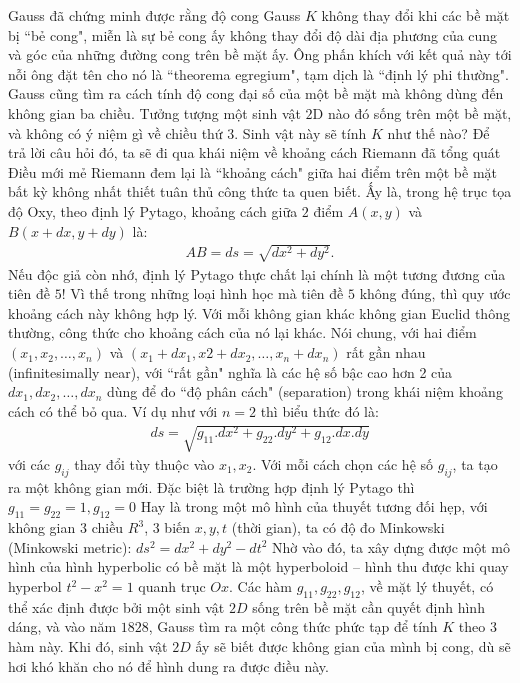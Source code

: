 \begin{multicols}{2}
	\vskip 0.1cm
	Gauss đã chứng minh được rằng độ cong Gauss $K$ không thay đổi khi các bề mặt bị ``bẻ cong", miễn là sự bẻ cong ấy không thay đổi độ dài địa phương của cung và góc của những đường cong trên bề mặt ấy. 
	\vskip 0.1cm
	Ông phấn khích với kết quả này tới nỗi ông đặt tên cho nó là ``theorema egregium", tạm dịch là ``định lý phi thường". Gauss cũng tìm ra cách tính độ cong đại số của một bề mặt mà không dùng đến không gian ba chiều. Tưởng tượng một sinh vật $2$D nào đó sống trên một bề mặt, và không có ý niệm gì về chiều thứ $3$. Sinh vật này sẽ tính $K$ như thế nào? Để trả lời câu hỏi đó, ta sẽ đi qua khái niệm về khoảng cách Riemann đã tổng quát
	\vskip 0.1cm
	Điều mới mẻ Riemann đem lại là ``khoảng cách" giữa hai điểm trên một bề mặt bất kỳ không nhất thiết tuân thủ công thức ta quen biết. Ấy là, trong hệ trục tọa độ Oxy, theo định lý Pytago, khoảng cách giữa $2$ điểm $A(x, y)$ và $B(x + dx, y + dy)$ là:
	\begin{align*}
		AB = ds = \sqrt{dx ^2 + dy^2}.
	\end{align*} 
	Nếu độc giả còn nhớ, định lý Pytago thực chất lại chính là một tương đương của tiên đề $5$! Vì thế trong những loại hình học mà tiên đề $5$ không đúng, thì quy ước khoảng cách này không hợp lý. Với mỗi không gian khác không gian Euclid thông thường, công thức cho khoảng cách của nó lại khác. Nói chung, với hai điểm $(x_1, x_2, \ldots, x_n)$ và $(x_1 + dx_1, x2 + dx_2, \ldots, x_n + dx_n)$ rất gần nhau (infinitesimally near), với ``rất gần" nghĩa là các hệ số bậc cao hơn 2 của $dx_1, dx_2, \ldots, dx_n$ dùng để đo ``độ phân cách" (separation) trong khái niệm khoảng cách có thể bỏ qua. Ví dụ như với $n = 2$ thì biểu thức đó là:
	\begin{align*}
		ds = \sqrt{g_{11}.dx ^2 + g_{22}. dy ^2 + g_{12}. dx.dy}
	\end{align*}
	với các $g_{ij}$ thay đổi tùy thuộc vào $x_1, x_2$. Với mỗi cách chọn các hệ số $g_{ij}$, ta tạo ra một không gian mới. 
	\vskip 0.1cm
	Đặc biệt là trường hợp định lý Pytago thì  $g_{11} = g_{22} = 1, g_{12} = 0$
	\vskip 0.1cm
	Hay là trong một mô hình của thuyết tương đối hẹp, với không gian $3$ chiều $R^3$, $3$ biến $x, y, t$ (thời gian), ta có độ đo Minkowski (Minkowski metric): $ds^2 = dx ^2 + dy^2 - dt ^2$
	\vskip 0.1cm
	Nhờ vào đó, ta xây dựng được một mô hình của hình hyperbolic có bề mặt là một hyperboloid -- hình thu được khi quay hyperbol $t^2 - x^2 = 1$ quanh trục $Ox$.
	\vskip 0.1cm
	Các hàm $g_{11}, g_{22}, g_{12}$, về mặt lý thuyết, có thể xác định được bởi một sinh vật $2D$ sống trên bề mặt cần quyết định hình dáng, và vào năm $1828$, Gauss tìm ra một công thức phức tạp để tính $K$ theo $3$ hàm này. Khi đó, sinh vật $2D$ ấy sẽ biết được không gian của mình bị cong, dù sẽ hơi khó khăn cho nó để hình dung ra được điều này.

\end{multicols}
